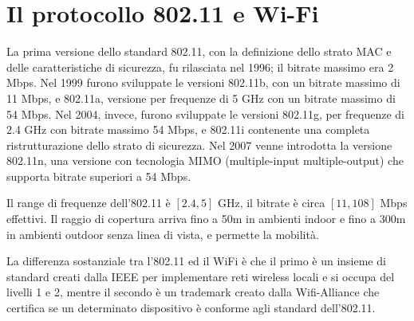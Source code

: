 \section{Il protocollo 802.11 e Wi-Fi}
La prima versione dello standard 802.11, con la definizione dello strato MAC e delle caratteristiche di sicurezza, fu rilasciata nel 1996; il bitrate massimo era 2 Mbps. Nel 1999 furono sviluppate le versioni 802.11b, con un bitrate massimo di 11 Mbps, e 802.11a, versione per frequenze di 5 GHz con un bitrate massimo di 54 Mbps. Nel 2004, invece, furono sviluppate le versioni 802.11g, per frequenze di 2.4 GHz con bitrate massimo 54 Mbps, e 802.11i contenente una completa ristrutturazione dello strato di sicurezza. Nel 2007 venne introdotta la versione 802.11n, una versione con tecnologia MIMO (multiple-input multiple-output) che supporta bitrate superiori a 54 Mbps.

Il range di frequenze dell'802.11 è $[2.4, 5]$ GHz, il bitrate è circa $[11, 108]$ Mbps effettivi. Il raggio di copertura arriva fino a 50m in ambienti indoor e fino a 300m in ambienti outdoor senza linea di vista, e permette la mobilità.

La differenza sostanziale tra l'802.11 ed il WiFi è che il primo è un insieme di standard creati dalla IEEE per implementare reti wireless locali e si occupa del livelli 1 e 2, mentre il secondo è un trademark creato dalla Wifi-Alliance che certifica se un determinato dispositivo è conforme agli standard dell'802.11.

